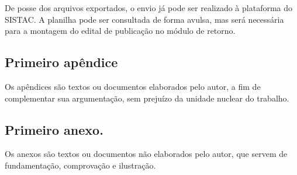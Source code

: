 \documentclass[
	12pt,			%
	openright,		%
	oneside,	
	a4paper,		%
	english,		%
	brazil			%
]{abntex2/abntex2}  %
\begin{document}
	De posse dos arquivos exportados, o envio já pode ser realizado à plataforma do SISTAC. A planilha pode ser consultada de forma avulsa, mas será necessária para a montagem do edital de publicação no módulo de retorno.

\postextual
{}



\begin{apendicesenv}

\chapter{Primeiro apêndice}

Os apêndices são textos ou documentos elaborados pelo autor, a fim de complementar sua argumentação, sem prejuízo da unidade nuclear do trabalho.

\end{apendicesenv}


\begin{anexosenv}

\chapter{Primeiro anexo.}

Os anexos são textos ou documentos não elaborados pelo autor, que servem de fundamentação, comprovação e ilustração.

\end{anexosenv}
\end{document}

